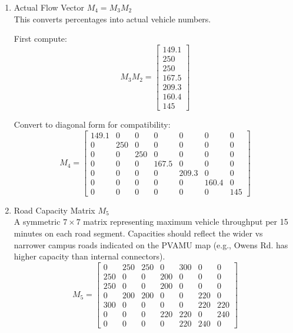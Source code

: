 \documentclass{ximera}
\begin{document}
\begin{enumerate}
    \[
M_3=
\begin{bmatrix}
0 & 0.33 & 0.33 & 0 & 0.34 & 0 & 0 \\
0.5 & 0 & 0 & 0.5 & 0 & 0 & 0 \\
0.5 & 0 & 0 & 0.5 & 0 & 0 & 0 \\
0 & 0.33 & 0.33 & 0 & 0 & 0.34 & 0 \\
0.33 & 0 & 0 & 0 & 0 & 0.33 & 0.34 \\
0 & 0 & 0 & 0.33 & 0.33 & 0 & 0.34 \\
0 & 0 & 0 & 0 & 0.5 & 0.5 & 0
\end{bmatrix}
\]


    \item Actual Flow Vector $M_4=M_3 M_2$\\
    This converts percentages into actual vehicle numbers.

    First compute:
\[
M_3M_2=
\begin{bmatrix}
149.1\\
250\\
250\\
167.5\\
209.3\\
160.4\\
145
\end{bmatrix}
\]

Convert to diagonal form for compatibility:
\[
M_4=
\begin{bmatrix}
149.1&0&0&0&0&0&0\\
0&250&0&0&0&0&0\\
0&0&250&0&0&0&0\\
0&0&0&167.5&0&0&0\\
0&0&0&0&209.3&0&0\\
0&0&0&0&0&160.4&0\\
0&0&0&0&0&0&145
\end{bmatrix}
\]

    \item Road Capacity Matrix $M_5$\\
    A symmetric $7\times 7$ matrix representing maximum vehicle throughput per 15 minutes on each road segment.
Capacities should reflect the wider vs narrower campus roads indicated on the PVAMU map
(e.g., Owens Rd. has higher capacity than internal connectors). \\

\[
M_5=
\begin{bmatrix}
0 & 250 & 250 & 0 & 300 & 0 & 0 \\
250 & 0 & 0 & 200 & 0 & 0 & 0 \\
250 & 0 & 0 & 200 & 0 & 0 & 0 \\
0 & 200 & 200 & 0 & 0 & 220 & 0 \\
300 & 0 & 0 & 0 & 0 & 220 & 220 \\
0 & 0 & 0 & 220 & 220 & 0 & 240 \\
0 & 0 & 0 & 0 & 220 & 240 & 0
\end{bmatrix}
\]


\end{enumerate}
\end{document}
